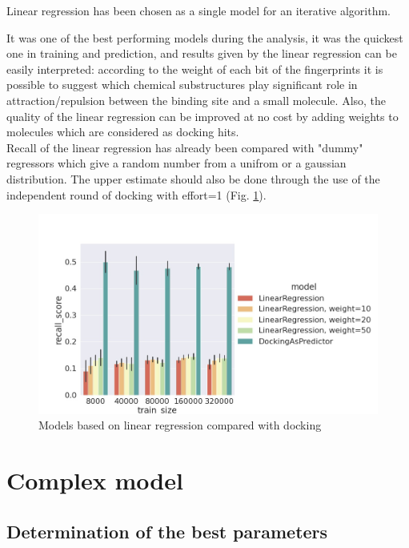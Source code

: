 Linear regression has been chosen as a single model for an iterative algorithm. 

It was one of the best performing models during the analysis, it was the quickest 
one in training and prediction, and results given by the linear regression can be easily 
interpreted: according to the weight of each bit of the fingerprints it is possible 
to suggest which chemical substructures play significant role in attraction/repulsion 
between the binding site and a small molecule. 
Also, the quality of the linear regression can be improved at no cost by adding 
weights to molecules which are considered as docking hits.\\

Recall of the linear regression has already been compared with "dummy" regressors 
which give a random number from a unifrom or a gaussian distribution.
The upper estimate should also be done through the use of the independent round 
of docking with effort=1 (Fig. \ref{linregVSdocking}).

\begin{figure}[H]
\includegraphics[scale = 0.45]{Images/LRvsD.jpg}
\caption{Models based on linear regression compared with docking}
\label{linregVSdocking}
\end{figure}

\hfill\break
\section{Complex model}

\subsection{Determination of the best parameters}

